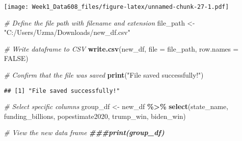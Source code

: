 \documentclass[
]{article}
\newenvironment{Shaded}{\begin{snugshade}}{\end{snugshade}}
\newcommand{\AttributeTok}[1]{\textcolor[rgb]{0.13,0.29,0.53}{#1}}
\newcommand{\CommentTok}[1]{\textcolor[rgb]{0.56,0.35,0.01}{\textit{#1}}}
\newcommand{\ConstantTok}[1]{\textcolor[rgb]{0.56,0.35,0.01}{#1}}
\newcommand{\DocumentationTok}[1]{\textcolor[rgb]{0.56,0.35,0.01}{\textbf{\textit{#1}}}}
\newcommand{\FunctionTok}[1]{\textcolor[rgb]{0.13,0.29,0.53}{\textbf{#1}}}
\newcommand{\NormalTok}[1]{#1}
\newcommand{\OtherTok}[1]{\textcolor[rgb]{0.56,0.35,0.01}{#1}}
\newcommand{\SpecialCharTok}[1]{\textcolor[rgb]{0.81,0.36,0.00}{\textbf{#1}}}
\newcommand{\StringTok}[1]{\textcolor[rgb]{0.31,0.60,0.02}{#1}}
\begin{document}
\texttt{[image: Week1\_Data608\_files/figure-latex/unnamed-chunk-27-1.pdf]}

\begin{Shaded}
\begin{Highlighting}[]
\CommentTok{\# Define the file path with filename and extension}
\NormalTok{file\_path }\OtherTok{\textless{}{-}} \StringTok{"C:/Users/Uzma/Downloads/new\_df.csv"}

\CommentTok{\# Write dataframe to CSV}
\FunctionTok{write.csv}\NormalTok{(new\_df, }\AttributeTok{file =}\NormalTok{ file\_path, }\AttributeTok{row.names =} \ConstantTok{FALSE}\NormalTok{)}

\CommentTok{\# Confirm that the file was saved}
\FunctionTok{print}\NormalTok{(}\StringTok{"File saved successfully!"}\NormalTok{)}
\end{Highlighting}
\end{Shaded}

\begin{verbatim}
## [1] "File saved successfully!"
\end{verbatim}

\begin{Shaded}
\begin{Highlighting}[]
\CommentTok{\# Select specific columns}
\NormalTok{group\_df }\OtherTok{\textless{}{-}}\NormalTok{ new\_df }\SpecialCharTok{\%\textgreater{}\%} \FunctionTok{select}\NormalTok{(state\_name, funding\_billions, popestimate2020, trump\_win, biden\_win)}

\CommentTok{\# View the new data frame}
\DocumentationTok{\#\#\#print(group\_df)}
\end{Highlighting}
\end{Shaded}
\end{document}
